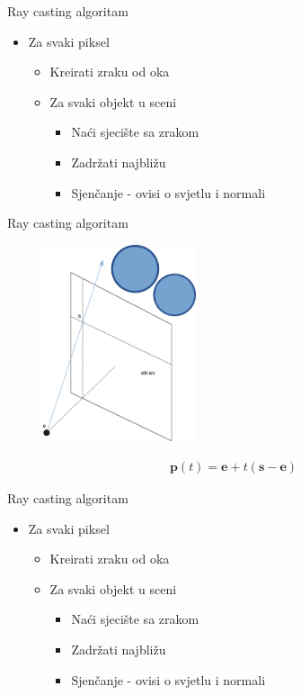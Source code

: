 \documentclass[9pt]{beamer}
\begin{document}
\begin{frame}{Ray casting algoritam}
\begin{itemize}
	\item Za svaki piksel
	\begin{itemize}
		\item \alert{Kreirati zraku od oka}
		\item Za svaki objekt u sceni
		\begin{itemize}
			\item Naći sjecište sa zrakom
			\item Zadržati najbližu
			\item Sjenčanje - ovisi o svjetlu i normali
		\end{itemize}
	\end{itemize}
\end{itemize}
\end{frame}

\begin{frame}{Ray casting algoritam}
\begin{figure}
	\includegraphics[width=0.4\textwidth]{./slike/zraka.png}
\end{figure}
\begin{align*}
	\textbf{p}(t) = \textbf{e} + t(\textbf{s} - \textbf{e})
\end{align*}
\end{frame}

\begin{frame}{Ray casting algoritam}
\begin{itemize}
	\item Za svaki piksel
	\begin{itemize}
		\item Kreirati zraku od oka
		\item \alert{Za svaki objekt u sceni}
		\begin{itemize}
			\item Naći sjecište sa zrakom
			\item Zadržati najbližu
			\item Sjenčanje - ovisi o svjetlu i normali
		\end{itemize}
	\end{itemize}
\end{itemize}
\end{frame}
\end{document}
